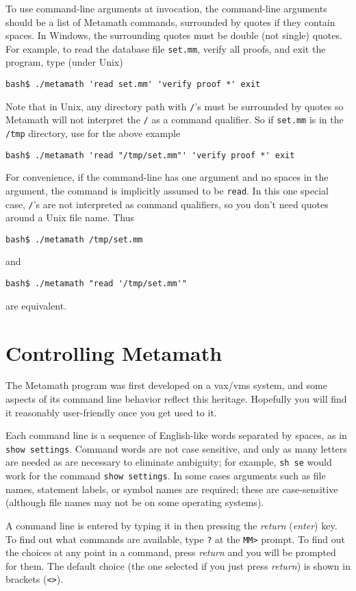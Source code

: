 To use command-line arguments at invocation, the command-line arguments
should be a list of Metamath commands, surrounded by quotes if they
contain spaces.  In Windows, the surrounding quotes must be double (not
single) quotes.  For example, to read the database file \texttt{set.mm},
verify all proofs, and exit the program, type (under Unix)
\begin{verbatim}
bash$ ./metamath 'read set.mm' 'verify proof *' exit
\end{verbatim}
Note that in Unix, any directory path with \texttt{/}'s must be
surrounded by quotes so Metamath will not interpret the \texttt{/} as a
command qualifier.  So if \texttt{set.mm} is in the \texttt{/tmp}
directory, use for the above example
\begin{verbatim}
bash$ ./metamath 'read "/tmp/set.mm"' 'verify proof *' exit
\end{verbatim}

For convenience, if the command-line has one argument and no spaces in
the argument, the command is implicitly assumed to be \texttt{read}.  In
this one special case, \texttt{/}'s are not interpreted as command
qualifiers, so you don't need quotes around a Unix file name.  Thus
\begin{verbatim}
bash$ ./metamath /tmp/set.mm
\end{verbatim}
and
\begin{verbatim}
bash$ ./metamath "read '/tmp/set.mm'"
\end{verbatim}
are equivalent.


\section{Controlling Metamath}

The Metamath program was first developed on a {\sc vax/vms} system, and
some aspects of its command line behavior reflect this heritage.
Hopefully you will find it reasonably user-friendly once you get used to
it.

Each command line is a sequence of English-like words separated by
spaces, as in \texttt{show settings}.  Command words are not case
sensitive, and only as many letters are needed as are necessary to
eliminate ambiguity; for example, \texttt{sh se} would work for the
command \texttt{show settings}.  In some cases arguments such as file
names, statement labels, or symbol names are required; these are
case-sensitive (although file names may not be on some operating
systems).

A command line is entered by typing it in then pressing the {\em return}
({\em enter}) key.  To find out what commands are available, type
\texttt{?} at the \texttt{MM>} prompt.  To find out the choices at any
point in a command, press {\em return} and you will be prompted for
them.  The default choice (the one selected if you just press {\em
return}) is shown in brackets (\texttt{<>}).

